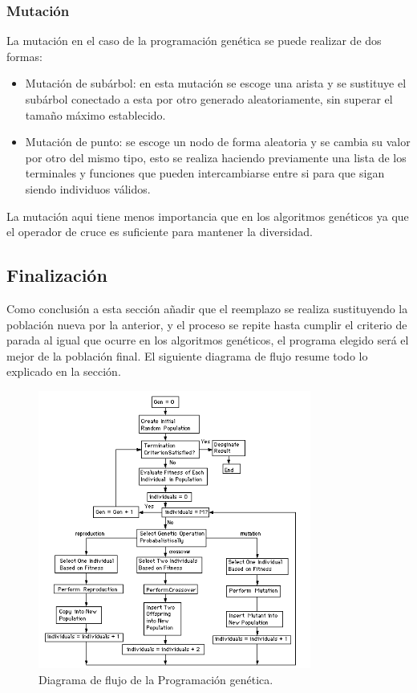 \documentclass[12pt]{article} \usepackage[utf8x]{inputenc}
\begin{document}
 \subsubsection{Mutación}
 
 La mutación en el caso de la programación genética se puede realizar de dos formas:
 
 \begin{itemize}
\item  Mutación de subárbol: en esta mutación se escoge una arista y se sustituye el subárbol conectado a esta por otro generado aleatoriamente, sin superar el tamaño máximo establecido.
\item  Mutación de punto: se escoge un nodo de forma aleatoria y se cambia su valor por otro del mismo tipo, esto se realiza haciendo previamente una lista de los terminales y funciones que pueden intercambiarse entre si para que sigan siendo individuos válidos.
\end{itemize}

La mutación aqui tiene menos importancia que en los algoritmos genéticos ya que el operador de cruce es suficiente para mantener la diversidad.

\subsection{Finalización}

Como conclusión a esta sección añadir que el reemplazo se realiza sustituyendo la población nueva por la anterior, y el proceso se repite hasta cumplir el criterio de parada al igual que ocurre en los algoritmos genéticos, el programa elegido será el mejor de la población final. El siguiente diagrama de flujo resume todo lo explicado en la sección.
  
\begin{figure}[H]
    \centering
    \includegraphics[width=0.8\textwidth]{FlowchartGP.PNG}
    \caption{Diagrama de flujo de la Programación genética.}
    \label{fig:dfd:1}
\end{figure}
\end{document}
